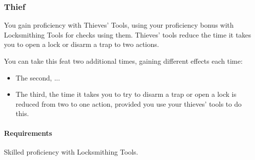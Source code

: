 \subsubsection{Thief} \label{feat::thief}
    You gain proficiency with Thieves' Tools, using your proficiency bonus with Locksmithing Tools for checks using them.
    Thieves' tools reduce the time it takes you to open a lock or disarm a trap to two actions.

    You can take this feat two additional times, gaining different effects each time:
    \begin{itemize}
        \item The second, ...
        \item The third, the time it takes you to try to disarm a trap or open a lock is reduced from two to one action, provided you use your thieves' tools to do this.
    \end{itemize}
    \paragraph{Requirements} Skilled proficiency with Locksmithing Tools.

